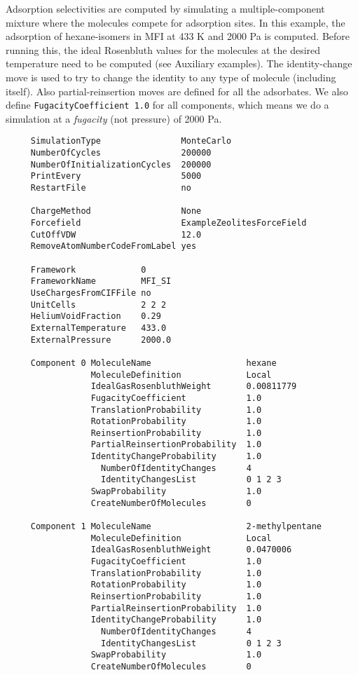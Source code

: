 Adsorption selectivities are computed by simulating a multiple-component mixture where the molecules compete for adsorption sites.
In this example, the adsorption of hexane-isomers in MFI at 433 K and 2000 Pa is computed.
Before running this, the ideal Rosenbluth values for the molecules at the desired temperature need to be computed (see Auxiliary examples).
The identity-change move is used to try to change the identity to any type of molecule (including itself).
Also partial-reinsertion moves are defined for all the adsorbates.
We also define \verb+FugacityCoefficient 1.0+ for all components, which means we do a simulation at a \emph{fugacity} (not pressure) of 2000 Pa.
\begin{tiny}
\begin{verbatim}
     SimulationType                MonteCarlo
     NumberOfCycles                200000
     NumberOfInitializationCycles  200000
     PrintEvery                    5000
     RestartFile                   no

     ChargeMethod                  None
     Forcefield                    ExampleZeolitesForceField
     CutOffVDW                     12.0
     RemoveAtomNumberCodeFromLabel yes

     Framework             0
     FrameworkName         MFI_SI
     UseChargesFromCIFFile no
     UnitCells             2 2 2
     HeliumVoidFraction    0.29
     ExternalTemperature   433.0
     ExternalPressure      2000.0

     Component 0 MoleculeName                   hexane
                 MoleculeDefinition             Local
                 IdealGasRosenbluthWeight       0.00811779
                 FugacityCoefficient            1.0
                 TranslationProbability         1.0
                 RotationProbability            1.0
                 ReinsertionProbability         1.0
                 PartialReinsertionProbability  1.0
                 IdentityChangeProbability      1.0
                   NumberOfIdentityChanges      4
                   IdentityChangesList          0 1 2 3
                 SwapProbability                1.0
                 CreateNumberOfMolecules        0

     Component 1 MoleculeName                   2-methylpentane
                 MoleculeDefinition             Local
                 IdealGasRosenbluthWeight       0.0470006
                 FugacityCoefficient            1.0
                 TranslationProbability         1.0
                 RotationProbability            1.0
                 ReinsertionProbability         1.0
                 PartialReinsertionProbability  1.0
                 IdentityChangeProbability      1.0
                   NumberOfIdentityChanges      4
                   IdentityChangesList          0 1 2 3
                 SwapProbability                1.0
                 CreateNumberOfMolecules        0


\end{verbatim}
\end{tiny}
